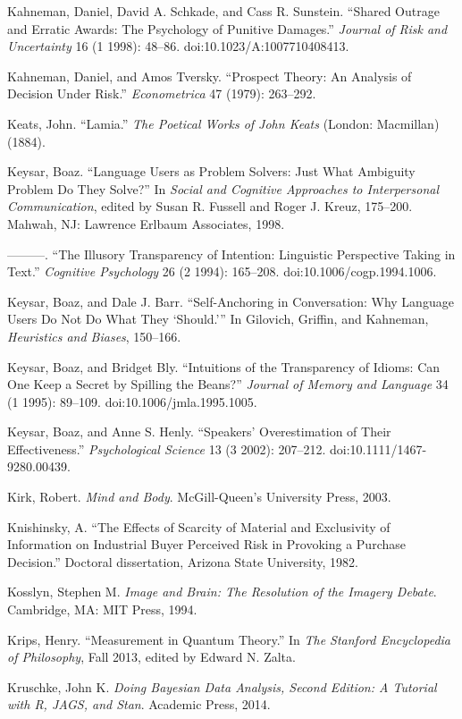 \documentclass[letterpaper]{book}
\begin{document}
{
 Kahneman, Daniel, David A. Schkade, and Cass R. Sunstein.
``Shared Outrage and Erratic Awards: The Psychology of
Punitive Damages.'' \textit{Journal of Risk and
Uncertainty} 16 (1 1998): 48--86. doi:10.1023/A:1007710408413.}

{
 Kahneman, Daniel, and Amos Tversky. ``Prospect
Theory: An Analysis of Decision Under Risk.''
\textit{Econometrica} 47 (1979): 263--292.}

{
 Keats, John. ``Lamia.''
\textit{The Poetical Works of John Keats} (London: Macmillan) (1884).}

{
 Keysar, Boaz. ``Language Users as Problem
Solvers: Just What Ambiguity Problem Do They Solve?''
In \textit{Social and Cognitive Approaches to Interpersonal
Communication}, edited by Susan R. Fussell and Roger J. Kreuz,
175--200. Mahwah, NJ: Lawrence Erlbaum Associates, 1998.}

{
 {}---{}---{}---. ``The Illusory Transparency of
Intention: Linguistic Perspective Taking in Text.''
\textit{Cognitive Psychology} 26 (2 1994): 165--208.
doi:10.1006/cogp.1994.1006.}

{
 Keysar, Boaz, and Dale J. Barr. ``Self-Anchoring
in Conversation: Why Language Users Do Not Do What They
`Should.''' In
Gilovich, Griffin, and Kahneman, \textit{Heuristics and Biases},
150--166.}

{
 Keysar, Boaz, and Bridget Bly. ``Intuitions of
the Transparency of Idioms: Can One Keep a Secret by Spilling the
Beans?'' \textit{Journal of Memory and Language} 34
(1 1995): 89--109. doi:10.1006/jmla.1995.1005.}

{
 Keysar, Boaz, and Anne S. Henly.
``Speakers' Overestimation of Their
Effectiveness.'' \textit{Psychological Science} 13 (3
2002): 207--212. doi:10.1111/1467-9280.00439.}

{
 Kirk, Robert. \textit{Mind and Body}.
McGill-Queen's University Press, 2003.}

{
 Knishinsky, A. ``The Effects of Scarcity of
Material and Exclusivity of Information on Industrial Buyer Perceived
Risk in Provoking a Purchase Decision.'' Doctoral
dissertation, Arizona State University, 1982.}

{
 Kosslyn, Stephen M. \textit{Image and Brain: The Resolution of the
Imagery Debate}. Cambridge, MA: MIT Press, 1994.}

{
 Krips, Henry. ``Measurement in Quantum
Theory.'' In \textit{The Stanford Encyclopedia of
Philosophy}, Fall 2013, edited by Edward N. Zalta.}

{
 Kruschke, John K. \textit{Doing Bayesian Data Analysis, Second
Edition: A Tutorial with R, JAGS, and Stan}. Academic Press, 2014.}
\end{document}
